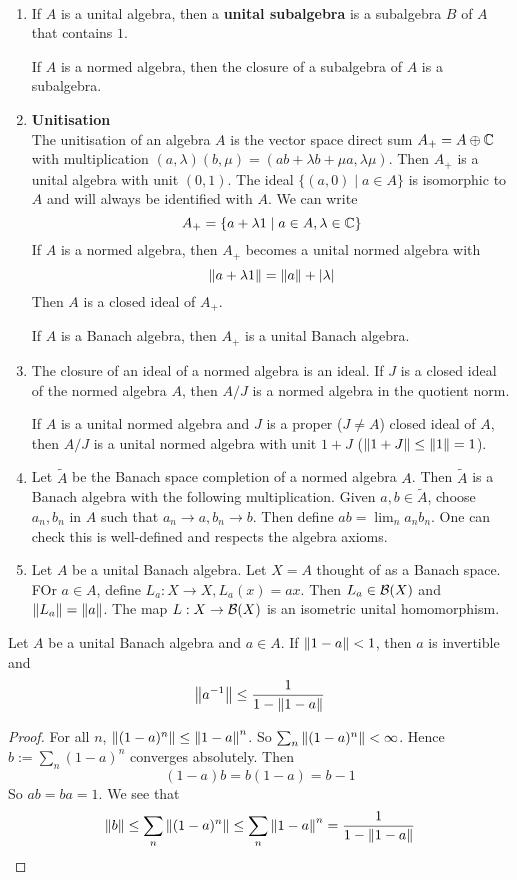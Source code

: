 \documentclass{article}
\begin{document}
\begin{dfn*}~
  \begin{enumerate}
    \item If $A$ is a unital algebra, then a {\bf unital subalgebra} is a subalgebra $B$ of $A$ that contains $1$.
    
    If $A$ is a normed algebra, then the closure of a subalgebra of $A$ is a subalgebra.
    \item {\bf Unitisation} \\
    The unitisation of an algebra $A$ is the vector space direct sum $A_+ = A \oplus \mathbb C$ with multiplication $(a, \lambda)(b, \mu) = (ab + \lambda b + \mu a, \lambda\mu)$. Then $A_+$ is a unital algebra with unit $(0, 1)$. The ideal $\{(a, 0) \mid a \in A\}$ is isomorphic to $A$ and will always be identified with $A$. We can write
    $$A_+ = \{a + \lambda 1 \mid a \in A, \lambda \in \mathbb C\}$$
    If $A$ is a normed algebra, then $A_+$ becomes a unital normed algebra with
    $$\left\lVert a + \lambda 1\right\rVert = \left\lVert a\right\rVert + \left\lvert \lambda\right\rvert$$
    Then $A$ is a closed ideal of $A_+$.

    If $A$ is a Banach algebra, then $A_+$ is a unital Banach algebra.
    \item The closure of an ideal of a normed algebra is an ideal. If $J$ is a closed ideal of the normed algebra $A$, then $A / J$ is a normed algebra in the quotient norm.
    
    If $A$ is a unital normed algebra and $J$ is a proper ($J \ne A$) closed ideal of $A$, then $A / J$ is a unital normed algebra with unit $1 + J$ ($\left\lVert 1 + J\right\rVert \le \left\lVert 1\right\rVert = 1$).
    \item Let $\tilde A$ be the Banach space completion of a normed algebra $A$. Then $\tilde A$ is a Banach algebra with the following multiplication. Given $a, b \in \tilde A$, choose $a_n, b_n$ in $A$ such that $a_n \to a, b_n \to b$. Then define $ab = \lim_n a_n b_n$. One can check this is well-defined and respects the algebra axioms.
    \item Let $A$ be a unital Banach algebra. Let $X = A$ thought of as a Banach space. FOr $a \in A$, define $L_a : X \to X, L_a(x) = ax$. Then $L_a \in \mathcal B(X)$ and $\left\lVert L_a\right\rVert = \left\lVert a\right\rVert$. The map $L : X \to \mathcal B(X)$ is an isometric unital homomorphism.
  \end{enumerate}
\end{dfn*}

\begin{lem}\label{lem:inverse-near-one}
  Let $A$ be a unital Banach algebra and $a \in A$. If $\left\lVert 1 - a\right\rVert < 1$, then $a$ is invertible and
  $$\left\lVert a^{-1}\right\rVert \le \frac 1{1 - \left\lVert 1 - a\right\rVert}$$
\end{lem}
\begin{proof}
  For all $n$, $\left\lVert (1 - a)^n\right\rVert \le \left\lVert 1 - a\right\rVert^n$. So $\sum_n \left\lVert (1 - a)^n\right\rVert < \infty$. Hence $b := \sum_n (1 - a)^n$ converges absolutely. Then
  $$(1 - a)b = b(1 - a) = b - 1$$
  So $ab = ba = 1$. We see that
  $$\left\lVert b\right\rVert \le \sum_n \left\lVert (1 - a)^n\right\rVert \le \sum_n \left\lVert 1 - a\right\rVert^n = \frac 1{1 - \left\lVert 1 - a\right\rVert}$$
\end{proof}
\end{document}
